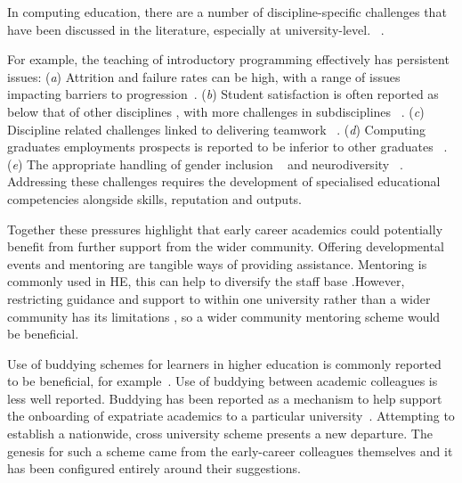 \documentclass[sigconf]{acmart}
\begin{document}
In computing education, there are a number of discipline-specific
challenges that have been discussed in the literature, especially at
university-level. ~\cite{davenport-et-al:latice2016,murphy-et-al:programming2017,simon-et-al:sigcse2018}.

For example, the teaching of introductory programming effectively has persistent issues:
({\emph{a}}) Attrition and failure rates can be high, with a range of issues
impacting barriers to progression~\cite{Watson:2014:FRI:2591708.2591749}.
({\emph{b}}) Student satisfaction is often reported as below that of other disciplines \cite{Sinclair2015}, with more challenges in subdisciplines ~\cite{Knutas2021}.
({\emph{c}}) Discipline related challenges linked to delivering teamwork ~\cite{Gordon2010,Phillips2021}.
({\emph{d}}) Computing graduates employments prospects is reported to be inferior to other graduates ~\cite{shadbolt2016shadbolt}.
({\emph{e}}) The appropriate handling of gender inclusion ~\cite{Winter2021} and neurodiversity ~\cite{Stuurman2109}. Addressing these challenges requires the development of specialised educational competencies alongside skills, reputation and outputs.

Together these pressures highlight that early career academics could
potentially benefit from further support from the wider
community. Offering developmental events and mentoring are tangible ways of providing assistance. Mentoring is commonly used in HE, this can help to diversify the staff base \cite{Golubchik2018}.However, restricting
guidance and support to within one university rather than a wider
community has its limitations \cite{Golubchik2018}, so a wider community mentoring scheme would be beneficial.

Use of buddying schemes for learners in higher education is commonly
reported to be beneficial, for example~\cite{Hayes2020,May20}. Use of
buddying between academic colleagues is less well reported. Buddying
has been reported as a mechanism to help support the
onboarding of expatriate academics to a particular
university~\cite{Wilkins2019}. Attempting to establish a nationwide,
cross university scheme presents a new departure. The genesis for such
a scheme came from the early-career colleagues themselves and it has
been configured entirely around their suggestions.
\end{document}
